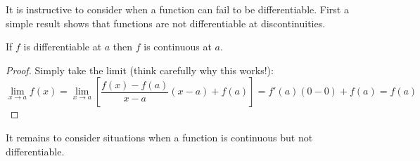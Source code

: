  It is instructive to consider when a function can fail to be differentiable. First a simple result shows that functions are not differentiable at discontinuities.

\begin{thm}{}{}
If $f$ is differentiable %
 at $a$ then $f$ is continuous at $a$.
\end{thm}

\begin{proof}
Simply take the limit (think carefully why this works!):
\[\lim_{x\to a}f(x)=\lim_{x\to a}\left[\frac{f(x)-f(a)}{x-a}(x-a)+f(a)\right] =f'(a)(0-0)+f(a) =f(a)\tag*{\qedhere}\]
\end{proof}

It remains to consider situations when a function is continuous but not differentiable.

